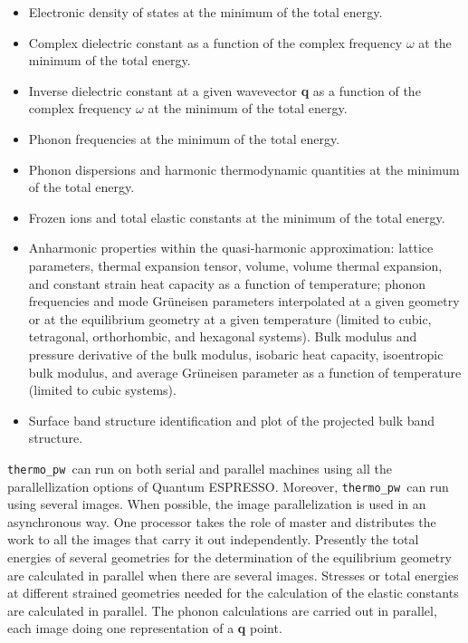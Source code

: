 \documentclass[12pt,a4paper]{article}
\def\qe{{\sc Quantum ESPRESSO}}
\def\thermo{\texttt{thermo\_pw}}
\begin{document}
\begin{itemize}
\item Electronic density of states at the minimum of the total energy.

\item Complex dielectric constant as a function of the complex
frequency $\omega$ at the minimum of the total energy.

\item Inverse dielectric constant at a given wavevector {\bf q} as a function 
of the complex frequency $\omega$ at the minimum of the total energy.

\item Phonon frequencies at the minimum of the total energy.

\item Phonon dispersions and harmonic thermodynamic quantities
at the minimum of the total energy.

\item Frozen ions and total elastic constants at the minimum of the total
energy.

\item Anharmonic properties within the quasi-harmonic approximation: 
lattice parameters, thermal expansion tensor, volume, volume thermal 
expansion, and constant strain heat capacity as a function of temperature; 
phonon frequencies and mode Gr\"uneisen parameters interpolated at a given
geometry or at the equilibrium geometry at a given temperature
(limited to cubic, tetragonal, orthorhombic, and hexagonal systems).
Bulk modulus and pressure derivative of the bulk modulus, isobaric heat 
capacity, isoentropic bulk modulus, and average Gr\"uneisen parameter as 
a function of temperature (limited to cubic systems).

\item Surface band structure identification and plot of the projected bulk
band structure.

\end{itemize}

\thermo\ can run on both serial and parallel machines using all 
the parallellization options of \qe. Moreover, \thermo\ can run using 
several images.
When possible, the image parallelization is used in an asynchronous way.
One processor takes the role of master and distributes the work 
to all the images that carry it out independently. Presently 
the total energies of several geometries for the determination of the 
equilibrium geometry are calculated in parallel when
there are several images. Stresses or total energies at different strained 
geometries needed for the calculation of the elastic constants are 
calculated in parallel. 
The phonon calculations are carried out in parallel, each image doing one 
representation of a {\bf q} point.
\end{document}
